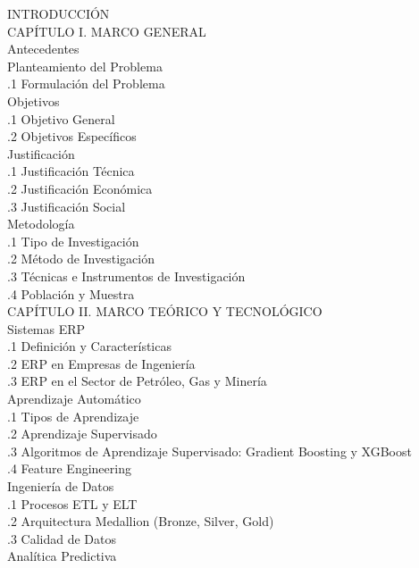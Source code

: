 \documentclass{univalle-perfil}
\begin{document}
\begin{indicetentativo}
INTRODUCCIÓN \\[2pt]
CAPÍTULO I. MARCO GENERAL \\
 Antecedentes \\
 Planteamiento del Problema \\
\quad{}.1 Formulación del Problema \\
 Objetivos \\
\quad{}.1 Objetivo General \\
\quad{}.2 Objetivos Específicos \\
 Justificación \\
\quad{}.1 Justificación Técnica \\
\quad{}.2 Justificación Económica \\
\quad{}.3 Justificación Social \\
 Metodología \\
\quad{}.1 Tipo de Investigación \\
\quad{}.2 Método de Investigación \\
\quad{}.3 Técnicas e Instrumentos de Investigación \\
\quad{}.4 Población y Muestra \\[2pt]
CAPÍTULO II. MARCO TEÓRICO Y TECNOLÓGICO \\
 Sistemas ERP \\
\quad{}.1 Definición y Características \\
\quad{}.2 ERP en Empresas de Ingeniería \\
\quad{}.3 ERP en el Sector de Petróleo, Gas y Minería \\
 Aprendizaje Automático \\
\quad{}.1 Tipos de Aprendizaje \\
\quad{}.2 Aprendizaje Supervisado \\
\quad{}.3 Algoritmos de Aprendizaje Supervisado: Gradient Boosting y XGBoost \\
\quad{}.4 Feature Engineering \\
 Ingeniería de Datos \\
\quad{}.1 Procesos ETL y ELT \\
\quad{}.2 Arquitectura Medallion (Bronze, Silver, Gold) \\
\quad{}.3 Calidad de Datos \\
 Analítica Predictiva \\

\end{indicetentativo}
\end{document}
